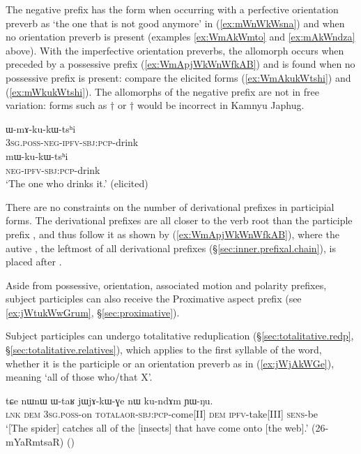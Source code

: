 The negative prefix has the form  when occurring with a perfective orientation preverb as  `the one that is not good anymore' in (\ref{ex:mWnWkWsna}) and  when no orientation preverb is present (examples \ref{ex:WmAkWmto} and \ref{ex:mAkWndza} above). With the imperfective orientation preverbs, the allomorph  occurs when preceded by a possessive prefix (\ref{ex:WmApjWkWnWfkAB}) and  is found when no possessive prefix is present: compare the elicited forms (\ref{ex:WmAkukWtshi}) and (\ref{ex:mWkukWtshi}). The allomorphs of the negative prefix are not in free variation: forms such as $\dagger$ or $\dagger$ would be incorrect in Kamnyu Japhug.

 \begin{exe} 
\ex \label{ex:WmAkukWtshi}
\gll ɯ-mɤ-ku-kɯ-tsʰi \\
\textsc{3sg}.\textsc{poss}-\textsc{neg}-\textsc{ipfv}-\textsc{sbj}:\textsc{pcp}-drink \\
\ex \label{ex:mWkukWtshi}
\gll mɯ-ku-kɯ-tsʰi \\
\textsc{neg}-\textsc{ipfv}-\textsc{sbj}:\textsc{pcp}-drink \\
\glt  `The one who drinks it.' (elicited)
\end{exe}

There are no constraints on the number of derivational prefixes in participial forms. The derivational prefixes are all closer to the verb root than the participle prefix , and thus follow it as shown by (\ref{ex:WmApjWkWnWfkAB}), where the autive , the leftmost of all derivational prefixes (§\ref{sec:inner.prefixal.chain}), is placed after . 

Aside from possessive, orientation, associated motion and polarity prefixes, subject participles can also receive the Proximative aspect prefix   (see \ref{ex:jWtukWwGrum}, §\ref{sec:proximative}).
 
Subject participles can undergo totalitative reduplication (§\ref{sec:totalitative.redp}, §\ref{sec:totalitative.relatives}), which applies to the first syllable of the word, whether it is the participle  or an orientation preverb as in (\ref{ex:jWjAkWGe}), meaning `all of those who/that X'.

\begin{exe}
\ex \label{ex:jWjAkWGe}
\gll tɕe nɯnɯ ɯ-taʁ jɯ\redp{}jɤ-kɯ-ɣe nɯ ku-ndɤm ɲɯ-ŋu. \\
\textsc{lnk} \textsc{dem} \textsc{3sg}.\textsc{poss}-on \textsc{total}\redp{}\textsc{aor}-\textsc{sbj}:\textsc{pcp}-come[II] \textsc{dem} \textsc{ipfv}-take[III] \textsc{sens}-be \\
\glt `[The spider] catches all of the [insects] that have come onto [the web].' (26-mYaRmtsaR) ()
\end{exe}

